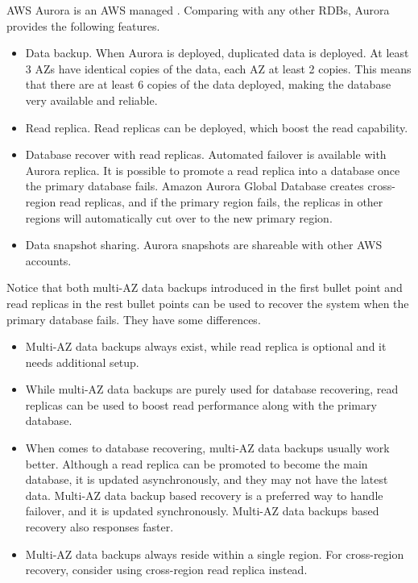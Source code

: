 AWS Aurora is an AWS managed . Comparing with any other RDBs, Aurora provides the following features.
\begin{itemize}
	\item Data backup. When Aurora is deployed, duplicated data is deployed. At least 3 AZs have identical copies of the data, each AZ at least 2 copies. This means that there are at least 6 copies of the data deployed, making the database very available and reliable.
	
	\item Read replica. Read replicas can be deployed, which boost the read capability.
	
	\item Database recover with read replicas. Automated failover is available with Aurora replica. It is possible to promote a read replica into a database once the primary database fails. Amazon Aurora Global Database creates cross-region read replicas, and if the primary region fails, the replicas in other regions will automatically cut over to the new primary region.
	
	\item Data snapshot sharing. Aurora snapshots are shareable with other AWS accounts.
	
\end{itemize}

Notice that both multi-AZ data backups introduced in the first bullet point and read replicas in the rest bullet points can be used to recover the system when the primary database fails. They have some differences.
\begin{itemize}
	\item Multi-AZ data backups always exist, while read replica is optional and it needs additional setup.
	\item While multi-AZ data backups are purely used for database recovering, read replicas can be used to boost read performance along with the primary database.
	\item When comes to database recovering, multi-AZ data backups usually work better. Although a read replica can be promoted to become the main database, it is updated asynchronously, and they may not have the latest data. Multi-AZ data backup based recovery is a preferred way to handle failover, and it is updated synchronously. Multi-AZ data backups based recovery also responses faster.
	\item Multi-AZ data backups always reside within a single region. For cross-region recovery, consider using cross-region read replica instead.
	
\end{itemize}

